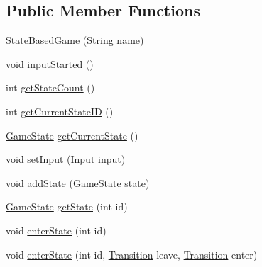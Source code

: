 \subsection*{Public Member Functions}
\begin{DoxyCompactItemize}
\item 
\mbox{\hyperlink{classorg_1_1newdawn_1_1slick_1_1state_1_1_state_based_game_a633720d1b5c44049c2ac6a016cb1072c}{State\+Based\+Game}} (String name)
\item 
void \mbox{\hyperlink{classorg_1_1newdawn_1_1slick_1_1state_1_1_state_based_game_a1a3ebc498cd4eee9660aae669746ed4f}{input\+Started}} ()
\item 
int \mbox{\hyperlink{classorg_1_1newdawn_1_1slick_1_1state_1_1_state_based_game_ab10064d261142bde013a71cac89bcbca}{get\+State\+Count}} ()
\item 
int \mbox{\hyperlink{classorg_1_1newdawn_1_1slick_1_1state_1_1_state_based_game_a44b9f05525f801a4f3fbfd85c22aa236}{get\+Current\+State\+ID}} ()
\item 
\mbox{\hyperlink{interfaceorg_1_1newdawn_1_1slick_1_1state_1_1_game_state}{Game\+State}} \mbox{\hyperlink{classorg_1_1newdawn_1_1slick_1_1state_1_1_state_based_game_a596eb5cb482d3de9bb2f77912bdb4bf6}{get\+Current\+State}} ()
\item 
void \mbox{\hyperlink{classorg_1_1newdawn_1_1slick_1_1state_1_1_state_based_game_a0d9931474b8c383d9cbf3026fc3a9c07}{set\+Input}} (\mbox{\hyperlink{classorg_1_1newdawn_1_1slick_1_1_input}{Input}} input)
\item 
void \mbox{\hyperlink{classorg_1_1newdawn_1_1slick_1_1state_1_1_state_based_game_acfd4acadb4a4f79fddd7e76250da37dc}{add\+State}} (\mbox{\hyperlink{interfaceorg_1_1newdawn_1_1slick_1_1state_1_1_game_state}{Game\+State}} state)
\item 
\mbox{\hyperlink{interfaceorg_1_1newdawn_1_1slick_1_1state_1_1_game_state}{Game\+State}} \mbox{\hyperlink{classorg_1_1newdawn_1_1slick_1_1state_1_1_state_based_game_a97fd8b52df599a2eddc2c52328a60601}{get\+State}} (int id)
\item 
void \mbox{\hyperlink{classorg_1_1newdawn_1_1slick_1_1state_1_1_state_based_game_a30b279d5177837e9d4eee745c79cc069}{enter\+State}} (int id)
\item 
void \mbox{\hyperlink{classorg_1_1newdawn_1_1slick_1_1state_1_1_state_based_game_a1e6c6f179348f22088d53780a2028d7c}{enter\+State}} (int id, \mbox{\hyperlink{interfaceorg_1_1newdawn_1_1slick_1_1state_1_1transition_1_1_transition}{Transition}} leave, \mbox{\hyperlink{interfaceorg_1_1newdawn_1_1slick_1_1state_1_1transition_1_1_transition}{Transition}} enter)

\end{DoxyCompactItemize}
